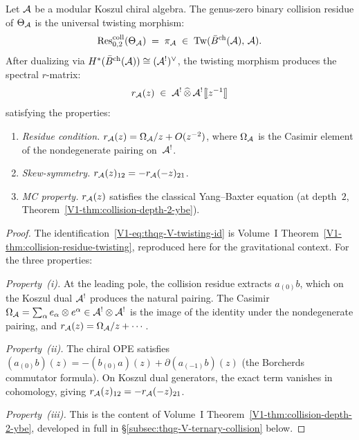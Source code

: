 \begin{theorem}[Collision residue = twisting morphism, revisited;
\ClaimStatusProvedHere]
\label{thm:thqg-V-collision-twisting}
Let $\mathcal{A}$ be a modular Koszul chiral algebra. The genus-zero binary
collision residue of $\Theta_{\mathcal{A}}$ is the universal twisting morphism:
\begin{equation}%
\Rescoll_{0,2}(\Theta_\cA)
\;=\;
\pi_\cA
\;\in\;
\mathrm{Tw}(\barBch(\cA),\,\cA).
\end{equation}
After dualizing via $H^*(\bar{B}^{\text{ch}}(\mathcal{A})) \cong (\mathcal{A}^!)^\vee$, the
twisting morphism produces the spectral $r$-matrix:
\begin{equation}%
r_\cA(z)
\;\in\;
\cA^! \,\widehat{\otimes}\, \cA^!\bigl[\![z^{-1}]\!\bigr]
\end{equation}
satisfying the properties:
\begin{enumerate}[label=\textup{(\roman*)}]
\item \emph{Residue condition.}
 $r_{\mathcal{A}}(z) = \Omega_{\mathcal{A}} / z + O(z^{-2})$,
 where $\Omega_{\mathcal{A}}$ is the Casimir element of the nondegenerate
 pairing on~$\mathcal{A}^!$.
\item \emph{Skew-symmetry.}
 $r_{\mathcal{A}}(z)_{12} = -r_{\mathcal{A}}(-z)_{21}$.
\item \emph{MC property.}
 $r_{\mathcal{A}}(z)$ satisfies the classical Yang--Baxter equation
 \textup{(}at depth~$2$,
 Theorem~\textup{\ref{V1-thm:collision-depth-2-ybe})}.
\end{enumerate}
\end{theorem}

\begin{proof}
The identification~\eqref{V1-eq:thqg-V-twisting-id} is Volume~I
Theorem~\ref{V1-thm:collision-residue-twisting}, reproduced here for
the gravitational context. For the three properties:

\emph{Property~(i).}
At the leading pole, the collision residue extracts $a_{(0)}b$,
which on the Koszul dual $\mathcal{A}^!$ produces the natural pairing.
The Casimir $\Omega_{\mathcal{A}} = \sum_\alpha e_\alpha \otimes e^\alpha
\in \mathcal{A}^! \otimes \mathcal{A}^!$ is the image of the identity under the
nondegenerate pairing, and $r_{\mathcal{A}}(z) = \Omega_{\mathcal{A}}/z + \cdots$.

\emph{Property~(ii).}
The chiral OPE satisfies
$(a_{(0)}b)(z) = -(b_{(0)}a)(z) + \partial(a_{(-1)}b)(z)$
(the Borcherds commutator formula). On Koszul dual generators,
the exact term vanishes in cohomology, giving
$r_{\mathcal{A}}(z)_{12} = -r_{\mathcal{A}}(-z)_{21}$.

\emph{Property~(iii).}
This is the content of Volume~I Theorem~\ref{V1-thm:collision-depth-2-ybe},
developed in full in
\S\ref{subsec:thqg-V-ternary-collision} below.
\end{proof}


